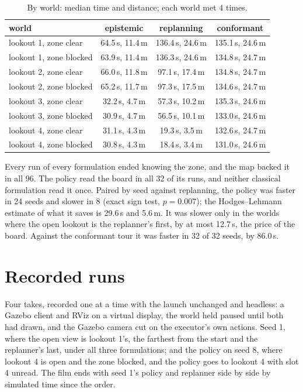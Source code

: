 \documentclass[11pt,a4paper]{article}
\theoremstyle{definition}
\begin{document}
\begin{table}[H]
\centering
\small
\begin{tabular}{@{}lccc@{}}
\toprule
world & epistemic & replanning & conformant \\
\midrule
lookout 1, zone clear & 64.5\,s, 11.4\,m & 136.4\,s, 24.6\,m & 135.1\,s, 24.6\,m \\
lookout 1, zone blocked & 63.9\,s, 11.4\,m & 136.3\,s, 24.6\,m & 134.8\,s, 24.7\,m \\
lookout 2, zone clear & 66.0\,s, 11.8\,m & 97.1\,s, 17.4\,m & 134.8\,s, 24.7\,m \\
lookout 2, zone blocked & 65.2\,s, 11.7\,m & 97.3\,s, 17.5\,m & 134.6\,s, 24.7\,m \\
lookout 3, zone clear & 32.2\,s, 4.7\,m & 57.3\,s, 10.2\,m & 135.3\,s, 24.6\,m \\
lookout 3, zone blocked & 30.9\,s, 4.7\,m & 56.5\,s, 10.1\,m & 133.0\,s, 24.6\,m \\
lookout 4, zone clear & 31.1\,s, 4.3\,m & 19.3\,s, 3.5\,m & 132.6\,s, 24.7\,m \\
lookout 4, zone blocked & 30.8\,s, 4.3\,m & 18.4\,s, 3.4\,m & 131.0\,s, 24.6\,m \\
\bottomrule
\end{tabular}
\caption{By world: median time and distance; each world met 4 times.}
\end{table}

Every run of every formulation ended knowing the zone, and the map backed it in all 96. The policy read the board in all 32 of its runs, and neither classical formulation read it once. Paired by seed against replanning, the policy was faster in 24 seeds and slower in 8 (exact sign test, $p = 0.007$); the Hodges--Lehmann estimate of what it saves is 29.6\,s and 5.6\,m. It was slower only in the worlds where the open lookout is the replanner's first, by at most 12.7\,s, the price of the board. Against the conformant tour it was faster in 32 of 32 seeds, by 86.0\,s.

\section{Recorded runs}

Four takes, recorded one at a time with the launch unchanged and headless: a Gazebo client and RViz on a virtual display, the world held paused until both had drawn, and the Gazebo camera cut on the executor's own actions. Seed 1, where the open view is lookout 1's, the farthest from the start and the replanner's last, under all three formulations; and the policy on seed 8, where lookout 4 is open and the zone blocked, and the policy goes to lookout 4 with slot 4 unread. The film ends with seed 1's policy and replanner side by side by simulated time since the order.
\end{document}
